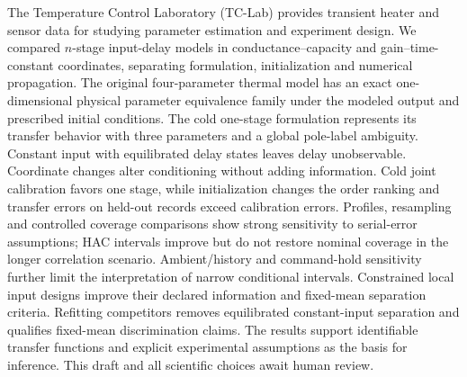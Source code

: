 The Temperature Control Laboratory (TC-Lab) provides transient heater and sensor
data for studying parameter estimation and experiment design. We compared
$n$-stage input-delay models in conductance--capacity and gain--time-constant
coordinates, separating formulation, initialization and numerical propagation.
The original four-parameter thermal model has an exact one-dimensional physical
parameter equivalence family under the modeled output and prescribed initial
conditions. The cold one-stage formulation represents its transfer behavior
with three parameters and a global pole-label ambiguity. Constant input with
equilibrated delay states leaves delay unobservable. Coordinate changes alter
conditioning without adding information. Cold joint calibration favors one
stage, while initialization changes the order ranking and transfer errors on
held-out records exceed calibration errors. Profiles, resampling and controlled
coverage comparisons show strong sensitivity to serial-error assumptions;
HAC intervals improve but do not restore nominal coverage in the longer
correlation scenario. Ambient/history and command-hold sensitivity further
limit the interpretation of narrow conditional intervals. Constrained local
input designs improve their declared information and fixed-mean separation
criteria. Refitting competitors removes equilibrated constant-input separation
and qualifies fixed-mean discrimination claims. The results support
identifiable transfer functions and explicit experimental assumptions as the
basis for inference. This draft and all scientific choices await human review.

